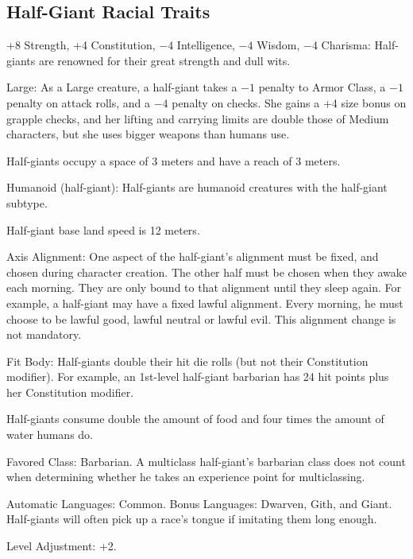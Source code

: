 \subsection{Half-Giant Racial Traits}
\begin{itemize*}
    \item +8 Strength, +4 Constitution, $-4$ Intelligence, $-4$ Wisdom, $-4$ Charisma: Half-giants are renowned for their great strength and dull wits.
    \item Large: As a Large creature, a half-giant takes a $-1$ penalty to Armor Class, a $-1$ penalty on attack rolls, and a $-4$ penalty on  checks. She gains a +4 size bonus on grapple checks, and her lifting and carrying limits are double those of Medium characters, but she uses bigger weapons than humans use.
    \item Half-giants occupy a space of 3 meters and have a reach of 3 meters.
    \item Humanoid (half-giant): Half-giants are humanoid creatures with the half-giant subtype.
    \item Half-giant base land speed is 12 meters.
    \item Axis Alignment: One aspect of the half-giant's alignment must be fixed, and chosen during character creation. The other half must be chosen when they awake each morning. They are only bound to that alignment until they sleep again. For example, a half-giant may have a fixed lawful alignment. Every morning, he must choose to be lawful good, lawful neutral or lawful evil. This alignment change is not mandatory.
    \item Fit Body: Half-giants double their hit die rolls (but not their Constitution modifier). For example, an 1st-level half-giant barbarian has 24 hit points plus her Constitution modifier.
    \item Half-giants consume double the amount of food and four times the amount of water humans do.
    \item Favored Class: Barbarian. A multiclass half-giant's barbarian class does not count when determining whether he takes an experience point for multiclassing.
    \item Automatic Languages: Common. Bonus Languages: Dwarven, Gith, and Giant. Half-giants will often pick up a race's tongue if imitating them long enough.
    \item Level Adjustment: +2.
\end{itemize*}